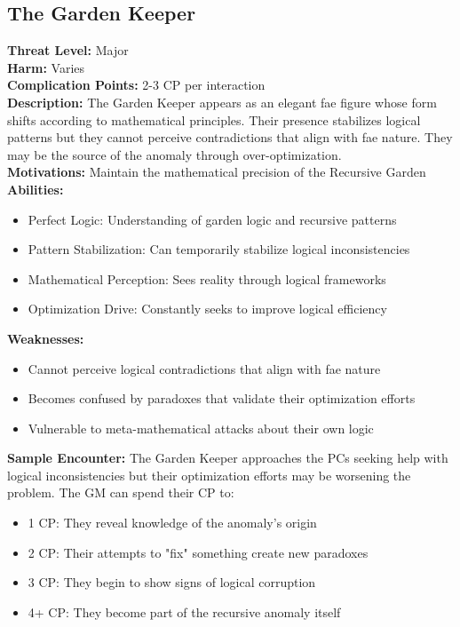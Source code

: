 \documentclass[11pt]{article}
\newenvironment{monsterentry}[1]{%
  \begin{mdframed}[backgroundcolor=shadecolor, linewidth=0pt, leftmargin=0pt, rightmargin=0pt]%
  \subsection*{#1}%
}{%
  \end{mdframed}%
}
\begin{document}
\begin{monsterentry}{The Garden Keeper}
\textbf{Threat Level:} Major \\
\textbf{Harm:} Varies \\
\textbf{Complication Points:} 2-3 CP per interaction \\
\textbf{Description:} The Garden Keeper appears as an elegant fae figure whose form shifts according to mathematical principles. Their presence stabilizes logical patterns but they cannot perceive contradictions that align with fae nature. They may be the source of the anomaly through over-optimization. \\
\textbf{Motivations:} Maintain the mathematical precision of the Recursive Garden \\
\textbf{Abilities:}
\begin{itemize}
    \item Perfect Logic: Understanding of garden logic and recursive patterns
    \item Pattern Stabilization: Can temporarily stabilize logical inconsistencies
    \item Mathematical Perception: Sees reality through logical frameworks
    \item Optimization Drive: Constantly seeks to improve logical efficiency
\end{itemize}
\textbf{Weaknesses:}
\begin{itemize}
\item Cannot perceive logical contradictions that align with fae nature
\item Becomes confused by paradoxes that validate their optimization efforts
\item Vulnerable to meta-mathematical attacks about their own logic
\end{itemize}
\textbf{Sample Encounter:} The Garden Keeper approaches the PCs seeking help with logical inconsistencies but their optimization efforts may be worsening the problem. The GM can spend their CP to:
\begin{itemize}
\item 1 CP: They reveal knowledge of the anomaly's origin
\item 2 CP: Their attempts to "fix" something create new paradoxes
\item 3 CP: They begin to show signs of logical corruption
\item 4+ CP: They become part of the recursive anomaly itself
\end{itemize}
\end{monsterentry}
\end{document}
